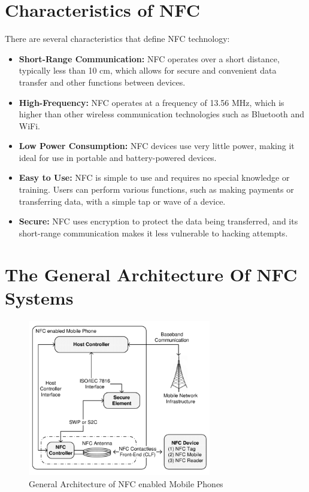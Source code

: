 \documentclass[12pt,a4paper]{article}
\begin{document}
\section*{Characteristics of NFC}
There are several characteristics that define NFC technology:
\begin{itemize}
    \item \textbf{Short-Range Communication:} NFC operates over a short distance, typically less than 10 cm, which allows for secure and convenient data transfer and other functions between devices.
    \item \textbf{High-Frequency:} NFC operates at a frequency of 13.56 MHz, which is higher than other wireless communication technologies such as Bluetooth and WiFi.
    \item \textbf{Low Power Consumption:} NFC devices use very little power, making it ideal for use in portable and battery-powered devices.
    \item \textbf{Easy to Use:} NFC is simple to use and requires no special knowledge or training. Users can perform various functions, such as making payments or transferring data, with a simple tap or wave of a device.
    \item \textbf{Secure:} NFC uses encryption to protect the data being transferred, and its short-range communication makes it less vulnerable to hacking attempts.
\end{itemize}

\section*{The General Architecture Of NFC Systems}

\begin{figure}[H]
    \centering
    \includegraphics[width=8cm]{nfc.png}
    \caption{General Architecture of NFC enabled Mobile Phones}
\end{figure}
\end{document}
